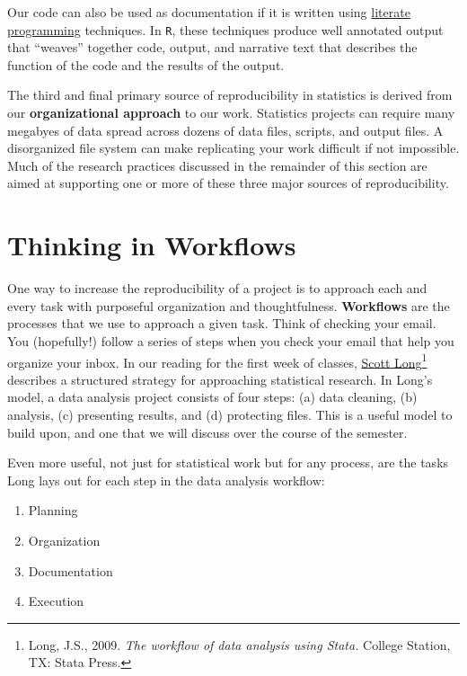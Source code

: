 \documentclass[]{book}
\providecommand{\tightlist}{%
  \setlength{\itemsep}{0pt}\setlength{\parskip}{0pt}}
\let\rmarkdownfootnote\footnote%
\def\footnote{\protect\rmarkdownfootnote}
\theoremstyle{definition}
\theoremstyle{definition}
\theoremstyle{remark}
\begin{document}
Our code can also be used as documentation if it is written using
\href{https://en.wikipedia.org/wiki/Literate_programming}{literate
programming} techniques. In \texttt{R}, these techniques produce well
annotated output that ``weaves'' together code, output, and narrative
text that describes the function of the code and the results of the
output.

The third and final primary source of reproducibility in statistics is
derived from our \textbf{organizational approach} to our work.
Statistics projects can require many megabyes of data spread across
dozens of data files, scripts, and output files. A disorganized file
system can make replicating your work difficult if not impossible. Much
of the research practices discussed in the remainder of this section are
aimed at supporting one or more of these three major sources of
reproducibility.

\section{Thinking in Workflows}\label{thinking-in-workflows}

One way to increase the reproducibility of a project is to approach each
and every task with purposeful organization and thoughtfulness.
\textbf{Workflows} are the processes that we use to approach a given
task. Think of checking your email. You (hopefully!) follow a series of
steps when you check your email that help you organize your inbox. In
our reading for the first week of classes,
\href{http://www.indiana.edu/~jslsoc/}{Scott Long}\footnote{Long, J.S.,
  2009. \emph{The workflow of data analysis using Stata.} College
  Station, TX: Stata Press.} describes a structured strategy for
approaching statistical research. In Long's model, a data analysis
project consists of four steps: (a) data cleaning, (b) analysis, (c)
presenting results, and (d) protecting files. This is a useful model to
build upon, and one that we will discuss over the course of the
semester.

Even more useful, not just for statistical work but for any process, are
the tasks Long lays out for each step in the data analysis workflow:

\begin{enumerate}
\def\labelenumi{\arabic{enumi}.}
\tightlist
\item
  Planning
\item
  Organization
\item
  Documentation
\item
  Execution
\end{enumerate}
\end{document}
